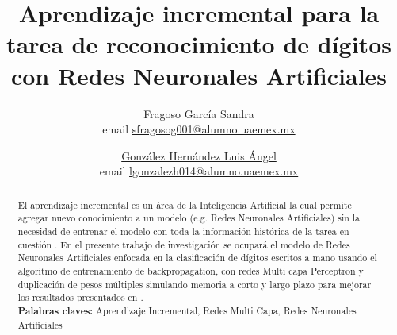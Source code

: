 \documentclass[10pt,a4paper]{article}
\title{Aprendizaje incremental para la tarea de reconocimiento
de dígitos con Redes Neuronales Artificiales}
\author{
    Fragoso García Sandra \\ email \href{mailto:sfragosog001@alumno.uaemex.mx}{sfragosog001@alumno.uaemex.mx}
    \and \underline{González Hernández Luis Ángel} \\ email \href{mailto:lgonzalezh014@alumno.uaemex.mx}{lgonzalezh014@alumno.uaemex.mx}
}
\begin{document}
    
    \tableofcontents
    \listoffigures
    \newpage
    \maketitle
    \begin{abstract}
        El aprendizaje incremental es un área de la Inteligencia Artificial la cual permite agregar nuevo conocimiento 
        a un modelo (e.g. Redes Neuronales Artificiales) sin la necesidad de entrenar el modelo con toda la información 
        histórica de la tarea en cuestión \cite{bullinaria2009}. En el presente trabajo de investigación se ocupará el modelo de Redes 
        Neuronales Artificiales enfocada en la clasificación de dígitos escritos a mano usando el algoritmo de 
        entrenamiento de backpropagation, con redes Multi capa Perceptron y duplicación de pesos múltiples 
        simulando memoria a corto y largo plazo para mejorar los resultados presentados en \cite{bullinaria2009}.\\

        \textbf{Palabras claves:} Aprendizaje Incremental, Redes Multi Capa, Redes Neuronales Artificiales
    \end{abstract}

    
    
    
    
    
    
    
    
    
    
    
    

	
    
\end{document}
